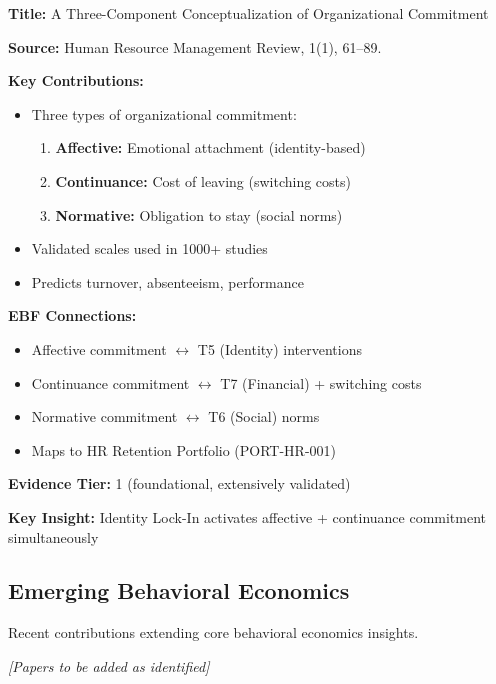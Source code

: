 \begin{tcolorbox}[colback=yellow!5!white,colframe=yellow!75!black,title=Key Paper: Meyer \& Allen (1991)]
\textbf{Title:} A Three-Component Conceptualization of Organizational Commitment

\textbf{Source:} Human Resource Management Review, 1(1), 61--89.

\textbf{Key Contributions:}
\begin{itemize}
    \item Three types of organizational commitment:
    \begin{enumerate}
        \item \textbf{Affective:} Emotional attachment (identity-based)
        \item \textbf{Continuance:} Cost of leaving (switching costs)
        \item \textbf{Normative:} Obligation to stay (social norms)
    \end{enumerate}
    \item Validated scales used in 1000+ studies
    \item Predicts turnover, absenteeism, performance
\end{itemize}

\textbf{EBF Connections:}
\begin{itemize}
    \item Affective commitment $\leftrightarrow$ T5 (Identity) interventions
    \item Continuance commitment $\leftrightarrow$ T7 (Financial) + switching costs
    \item Normative commitment $\leftrightarrow$ T6 (Social) norms
    \item Maps to HR Retention Portfolio (PORT-HR-001)
\end{itemize}

\textbf{Evidence Tier:} 1 (foundational, extensively validated)

\textbf{Key Insight:} Identity Lock-In activates affective + continuance commitment simultaneously
\end{tcolorbox}

\subsection{Emerging Behavioral Economics}
\label{subsec:ot-emerging}

Recent contributions extending core behavioral economics insights.

\textit{[Papers to be added as identified]}

